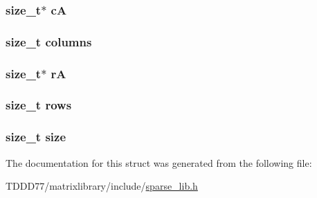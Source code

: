 \subsubsection[{c\+A}]{\setlength{\rightskip}{0pt plus 5cm}size\+\_\+t$\ast$ c\+A}\label{structsparse__matrix_aa042aece3554064ce87de3adbe34028d}
\hypertarget{structsparse__matrix_a8f286185a216a03cae5eb89c39f19349}{}
\subsubsection[{columns}]{\setlength{\rightskip}{0pt plus 5cm}size\+\_\+t columns}\label{structsparse__matrix_a8f286185a216a03cae5eb89c39f19349}
\hypertarget{structsparse__matrix_aceadfed4e40af569df109589819f23ec}{}
\subsubsection[{r\+A}]{\setlength{\rightskip}{0pt plus 5cm}size\+\_\+t$\ast$ r\+A}\label{structsparse__matrix_aceadfed4e40af569df109589819f23ec}
\hypertarget{structsparse__matrix_ad161320eba27a8b966baac47bee35c46}{}
\subsubsection[{rows}]{\setlength{\rightskip}{0pt plus 5cm}size\+\_\+t rows}\label{structsparse__matrix_ad161320eba27a8b966baac47bee35c46}
\hypertarget{structsparse__matrix_a854352f53b148adc24983a58a1866d66}{}
\subsubsection[{size}]{\setlength{\rightskip}{0pt plus 5cm}size\+\_\+t size}\label{structsparse__matrix_a854352f53b148adc24983a58a1866d66}


The documentation for this struct was generated from the following file\+:\begin{DoxyCompactItemize}
\item 
T\+D\+D\+D77/matrixlibrary/include/\hyperlink{sparse__lib_8h}{sparse\+\_\+lib.\+h}\end{DoxyCompactItemize}
